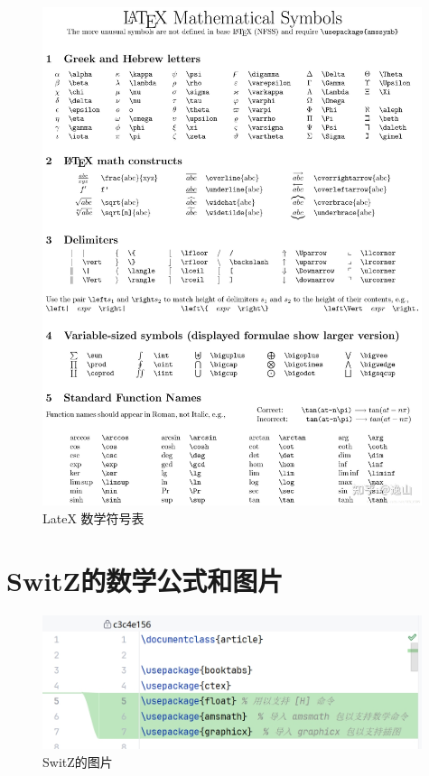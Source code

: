 \documentclass{article}
\begin{document}
\begin{figure}[H]
    \centering
    \includegraphics[width=0.99\textwidth]{img/latex-math-example.jpg}
    \caption{LateX 数学符号表}
    \label{fig:latex-math-symbols}
\end{figure}

\section{SwitZ的数学公式和图片}

\begin{figure}[H]
    \centering
    \includegraphics[width=0.99\textwidth]{img/switz_screenshot_250313_1711.png}
    \caption{SwitZ的图片}
    \label{fig:SwitZ-fig}
\end{figure}
\end{document}
